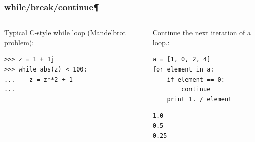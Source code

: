 \documentclass[colorlinks]{beamer}
\begin{document}
\begin{frame}[fragile]\frametitle{ while/break/continue¶}
\begin{columns}[T]

\begin{block}{Typical C-style while loop (Mandelbrot problem):}
\tiny
\begin{verbatim}
>>> z = 1 + 1j
>>> while abs(z) < 100:
...    z = z**2 + 1
... 
\end{verbatim}

\end{block}

\begin{block}{Continue the next iteration of a loop.:}
\tiny
\begin{verbatim}
a = [1, 0, 2, 4]
for element in a:
    if element == 0:
        continue
    print 1. / element

\end{verbatim}
\begin{verbatim}
1.0
0.5
0.25
\end{verbatim}

\end{block}
\end{columns}
\end{frame}
\end{document}
